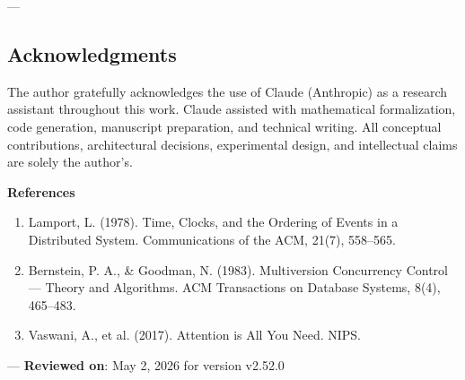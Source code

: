 ---
\subsection{Acknow\-ledgments}

The author gratefully ackno\-wledges the use of Claude (Anthropic) as a research assistant throughout this work. Claude assisted with mathe\-matical forma\-lization, code generation, manuscript preparation, and technical writing. All conceptual contr\-ibutions, archi\-tectural decisions, exper\-imental design, and intel\-lectual claims are solely the author's.

\textbf{References}
\begin{enumerate}
\item Lamport, L. (1978). Time, Clocks, and the Ordering of Events in a Distributed System. Commun\-ications of the ACM, 21(7), 558–565.
\item Bernstein, P. A., \& Goodman, N. (1983). Multiv\-ersion Concurrency Control — Theory and Algorithms. ACM Transa\-ctions on Database Systems, 8(4), 465–483.
\item Vaswani, A., et al. (2017). Attention is All You Need. NIPS.

\end{enumerate}
---
\textbf{Reviewed on}: May 2, 2026 for version v2.52.0
